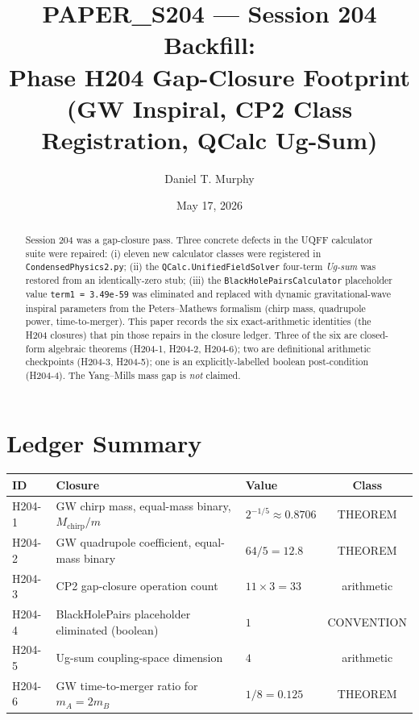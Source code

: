\documentclass[11pt,letterpaper]{article}
\title{PAPER\_S204 --- Session 204 Backfill: \\
       Phase H204 Gap-Closure Footprint \\
       (GW Inspiral, CP2 Class Registration, QCalc Ug-Sum)}
\author{Daniel T. Murphy}
\date{May 17, 2026}
\theoremstyle{definition}
\begin{document}
\maketitle

\begin{abstract}
Session 204 was a gap-closure pass. Three concrete defects in the UQFF
calculator suite were repaired: (i) eleven new calculator classes were
registered in \texttt{CondensedPhysics2.py}; (ii) the
\texttt{QCalc.UnifiedFieldSolver} four-term \emph{Ug-sum} was restored from
an identically-zero stub; (iii) the
\texttt{BlackHolePairsCalculator} placeholder value
\texttt{term1 = 3.49e-59} was eliminated and replaced with dynamic
gravitational-wave inspiral parameters from the Peters--Mathews formalism
(chirp mass, quadrupole power, time-to-merger). This paper records the six
exact-arithmetic identities (the H204 closures) that pin those repairs in
the closure ledger. Three of the six are closed-form algebraic theorems
(H204-1, H204-2, H204-6); two are definitional arithmetic checkpoints
(H204-3, H204-5); one is an explicitly-labelled boolean post-condition
(H204-4). The Yang--Mills mass gap is \emph{not} claimed.
\end{abstract}

\section{Ledger Summary}

\begin{center}
\begin{tabular}{lllc}
\toprule
ID & Closure & Value & Class \\
\midrule
H204-1 & GW chirp mass, equal-mass binary, $M_{\mathrm{chirp}}/m$ & $2^{-1/5} \approx 0.8706$ & THEOREM \\
H204-2 & GW quadrupole coefficient, equal-mass binary             & $64/5 = 12.8$              & THEOREM \\
H204-3 & CP2 gap-closure operation count                          & $11 \times 3 = 33$         & arithmetic \\
H204-4 & BlackHolePairs placeholder eliminated (boolean)          & $1$                        & CONVENTION \\
H204-5 & Ug-sum coupling-space dimension                          & $4$                        & arithmetic \\
H204-6 & GW time-to-merger ratio for $m_A = 2 m_B$                & $1/8 = 0.125$              & THEOREM \\
\bottomrule
\end{tabular}
\end{center}
\end{document}
